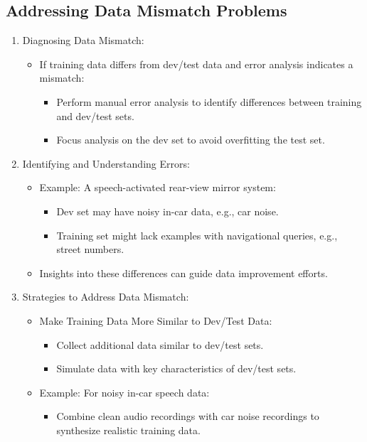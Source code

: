 \documentclass[letterpaper,12pt,notitlepage,twoside]{report}
\begin{document}
\subsection*{Addressing Data Mismatch Problems}
\begin{enumerate}
\item Diagnosing Data Mismatch:
\begin{itemize}
    \item If training data differs from dev/test data and error analysis indicates a mismatch:
    \begin{itemize}
        \item Perform manual error analysis to identify differences between training and dev/test sets.
        \item Focus analysis on the dev set to avoid overfitting the test set.
    \end{itemize}
\end{itemize}

\item Identifying and Understanding Errors:
\begin{itemize}
    \item Example: A speech-activated rear-view mirror system:
    \begin{itemize}
        \item Dev set may have noisy in-car data, e.g., car noise.
        \item Training set might lack examples with navigational queries, e.g., street numbers.
    \end{itemize}
    \item Insights into these differences can guide data improvement efforts.
\end{itemize}

\item Strategies to Address Data Mismatch:
\begin{itemize}
    \item Make Training Data More Similar to Dev/Test Data:
    \begin{itemize}
        \item Collect additional data similar to dev/test sets.
        \item Simulate data with key characteristics of dev/test sets.
    \end{itemize}
    \item Example: For noisy in-car speech data:
    \begin{itemize}
        \item Combine clean audio recordings with car noise recordings to synthesize realistic training data.
    \end{itemize}
\end{itemize}


\end{enumerate}
\end{document}
